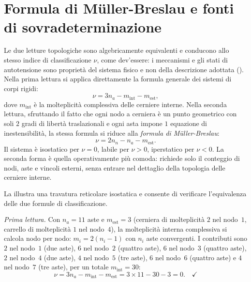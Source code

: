 \section{Formula di M\"{u}ller-Breslau e fonti di sovradeterminazione}
\label{sec:muller_breslau_classificazione}

Le due letture topologiche sono algebricamente
equivalenti e conducono allo stesso indice di
classificazione $\nu$, come dev'essere: i meccanismi e
gli stati di autotensione sono proprietà del sistema
fisico e non della descrizione adottata
(). Nella prima
lettura si applica direttamente la formula generale dei
sistemi di corpi rigidi:
\[
\nu = 3n_a - m_{\text{int}} - m_{\text{est}},
\]
dove $m_{\text{int}}$ è la molteplicità complessiva
delle cerniere interne. Nella seconda lettura,
sfruttando il fatto che ogni nodo a cerniera è un
punto geometrico con soli $2$ gradi di libertà
traslazionali e ogni asta impone $1$ equazione di
inestensibilità, la stessa formula si riduce alla
\emph{formula di M\"{u}ller-Breslau}:
\begin{equation}\label{eq:muller_breslau}
	\nu = 2n_n - n_a - m_{\text{est}}.
\end{equation}
Il sistema è isostatico per $\nu = 0$, labile per
$\nu > 0$, iperstatico per $\nu < 0$.
La seconda forma è quella operativamente più
comoda: richiede solo il conteggio di nodi, aste
e vincoli esterni, senza entrare nel dettaglio
della topologia delle cerniere interne.





La  illustra una travatura
reticolare isostatica e consente di verificare
l'equivalenza delle due formule di classificazione.

\noindent\textit{Prima lettura.}
Con $n_a = 11$ aste e $m_{\text{est}} = 3$
(cerniera di molteplicità $2$ nel nodo~$1$,
carrello di molteplicità $1$ nel nodo~$4$),
la molteplicità interna complessiva si calcola
nodo per nodo: $m_i = 2(n_i - 1)$ con $n_i$
aste convergenti. I contributi sono $2$ nel
nodo~$1$ (due aste), $6$ nel nodo~$2$ (quattro
aste), $6$ nel nodo~$3$ (quattro aste), $2$ nel
nodo~$4$ (due aste), $4$ nel nodo~$5$ (tre aste),
$6$ nel nodo~$6$ (quattro aste) e $4$ nel
nodo~$7$ (tre aste), per un totale
$m_{\text{int}} = 30$:
\[
\nu = 3n_a - m_{\text{int}} - m_{\text{est}}
= 3 \times 11 - 30 - 3 = 0. \quad\checkmark
\]

